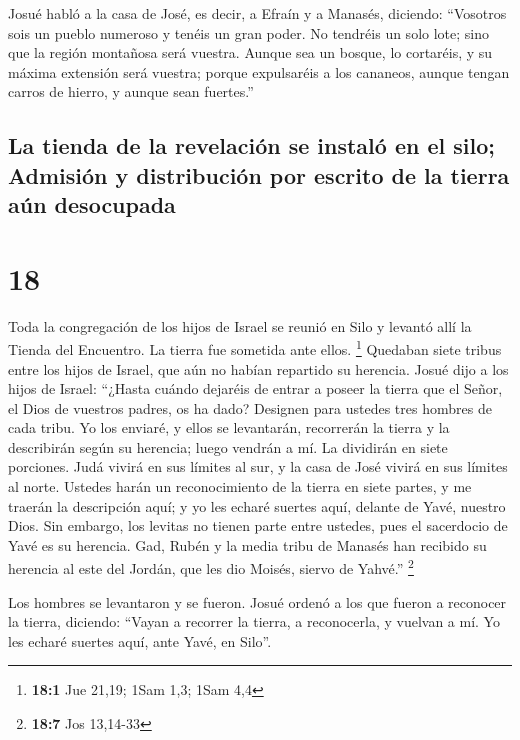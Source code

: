  Josué habló a la casa de José, es decir, a Efraín y a
Manasés, diciendo: ``Vosotros sois un pueblo numeroso y tenéis un gran
poder. No tendréis un solo lote;  sino que la región
montañosa será vuestra. Aunque sea un bosque, lo cortaréis, y su máxima
extensión será vuestra; porque expulsaréis a los cananeos, aunque tengan
carros de hierro, y aunque sean fuertes.''

\hypertarget{la-tienda-de-la-revelaciuxf3n-se-instaluxf3-en-el-silo-admisiuxf3n-y-distribuciuxf3n-por-escrito-de-la-tierra-auxfan-desocupada}{%
\subsection{La tienda de la revelación se instaló en el silo; Admisión y
distribución por escrito de la tierra aún
desocupada}\label{la-tienda-de-la-revelaciuxf3n-se-instaluxf3-en-el-silo-admisiuxf3n-y-distribuciuxf3n-por-escrito-de-la-tierra-auxfan-desocupada}}

\hypertarget{section-17}{%
\section{18}\label{section-17}}

 Toda la congregación de los hijos de Israel se reunió en
Silo y levantó allí la Tienda del Encuentro. La tierra fue sometida ante
ellos. \footnote{\textbf{18:1} Jue 21,19; 1Sam 1,3; 1Sam 4,4}
 Quedaban siete tribus entre los hijos de Israel, que aún
no habían repartido su herencia.  Josué dijo a los hijos
de Israel: ``¿Hasta cuándo dejaréis de entrar a poseer la tierra que el
Señor, el Dios de vuestros padres, os ha dado?  Designen
para ustedes tres hombres de cada tribu. Yo los enviaré, y ellos se
levantarán, recorrerán la tierra y la describirán según su herencia;
luego vendrán a mí.  La dividirán en siete porciones. Judá
vivirá en sus límites al sur, y la casa de José vivirá en sus límites al
norte.  Ustedes harán un reconocimiento de la tierra en
siete partes, y me traerán la descripción aquí; y yo les echaré suertes
aquí, delante de Yavé, nuestro Dios.  Sin embargo, los
levitas no tienen parte entre ustedes, pues el sacerdocio de Yavé es su
herencia. Gad, Rubén y la media tribu de Manasés han recibido su
herencia al este del Jordán, que les dio Moisés, siervo de Yahvé.''
\footnote{\textbf{18:7} Jos 13,14-33}

 Los hombres se levantaron y se fueron. Josué ordenó a los
que fueron a reconocer la tierra, diciendo: ``Vayan a recorrer la
tierra, a reconocerla, y vuelvan a mí. Yo les echaré suertes aquí, ante
Yavé, en Silo''.

